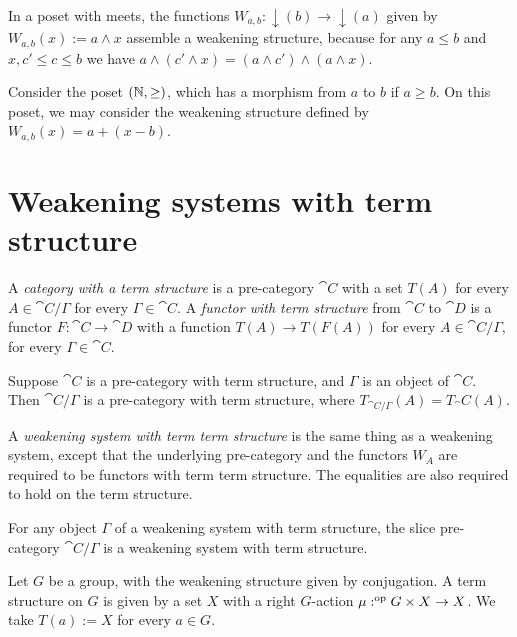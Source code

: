 \begin{eg}
In a poset with meets, the functions $W_{a,b}:{\downarrow}(b)\to{\downarrow}(a)$
given by $W_{a,b}(x):= a\land x$ assemble a weakening structure, because for
any $a\leq b$ and $x,c'\leq c\leq b$ we have $a\land(c'\land x)=(a\land c')\land
(a\land x)$.  
\end{eg}

\begin{eg}
Consider the poset $(\mathbb{N},\geq)$, which has a morphism from $a$ to $b$ if $a\geq b$.
On this poset, we may consider the weakening structure defined by $W_{a,b}(x)=
a+(x-b)$.
\end{eg}

\section{Weakening systems with term structure}
\begin{defn}
A \emph{category with a term structure} is a pre-category $\cat{C}$ with a set $T(A)$ for every
$A\in\cat{C}/\Gamma$ for every $\Gamma\in\cat{C}$. A \emph{functor with term structure} from $\cat{C}$ to $\cat{D}$
is a functor $F:\cat{C}\to\cat{D}$ with a function $T(A)\to T(F(A))$ for
every $A\in\cat{C}/\Gamma$, for every $\Gamma\in\cat{C}$.
\end{defn}

\begin{defn}
Suppose $\cat{C}$ is a pre-category with term structure, and $\Gamma$ is an object of $\cat{C}$. 
Then $\cat{C}/\Gamma$ is a pre-category with term structure, where $T_{\cat{C}/\Gamma}(A)=T_\cat{C}(A)$.
\end{defn}

\begin{defn}
A \emph{weakening system with term term structure} is the same thing as a weakening system,
except that the underlying pre-category and the functors $W_A$ are required to
be functors with term term structure. The equalities are also required to hold on the term structure.
\end{defn}

\begin{cor}
For any object $\Gamma$ of a weakening system with term structure, the slice pre-category
$\cat{C}/\Gamma$ is a weakening system with term structure.
\end{cor}

\begin{eg}

Let $G$ be a group, with the weakening structure given by conjugation. A term
structure on $G$ is given by a set $X$ with a right $G$-action $\mu:^{\mathrm{op}} G\times X\to X$.
We take $T(a):= X$ for every $a\in G$.
\end{eg}

